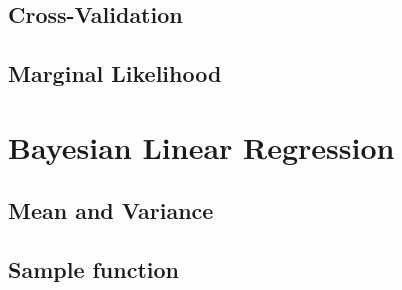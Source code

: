 	\subsection{Cross-Validation}

	\subsection{Marginal Likelihood}

\section{Bayesian Linear Regression}

	\subsection{Mean and Variance}

	\subsection{Sample function}

